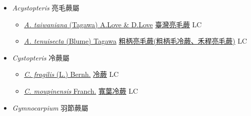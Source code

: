 
  \begin{itemize}
 \item[] \textit{Acystopteris} 亮毛蕨屬
                    
  \begin{itemize}
        \item[] \href{http://www.theplantlist.org/tpl1.1/search?q=Acystopteris+taiwaniana}{\textit{A. taiwaniana} (Tagawa) A.Love \& D.Love}   \href{\detokenize{http://taibnet.sinica.edu.tw/chi/taibnet_species_list.php?T2=臺灣亮毛蕨&T2_new_value=true&fr=y}}{臺灣亮毛蕨} LC
        \item[] \href{http://www.theplantlist.org/tpl1.1/search?q=Acystopteris+tenuisecta}{\textit{A. tenuisecta} (Blume) Tagawa}     \href{\detokenize{http://taibnet.sinica.edu.tw/chi/taibnet_species_list.php?T2=粗柄亮毛蕨&T2_new_value=true&fr=y}}{粗柄亮毛蕨(粗柄毛冷蕨、禾稈亮毛蕨)}    LC
  \end{itemize}
 \item[] \textit{Cystopteris} 冷蕨屬
                    
  \begin{itemize}
        \item[] \href{http://www.theplantlist.org/tpl1.1/search?q=Cystopteris+fragilis}{\textit{C. fragilis} (L.) Bernh.}   \href{\detokenize{http://taibnet.sinica.edu.tw/chi/taibnet_species_list.php?T2=冷蕨&T2_new_value=true&fr=y}}{冷蕨} LC
        \item[] \href{http://www.theplantlist.org/tpl1.1/search?q=Cystopteris+moupinensis}{\textit{C. moupinensis} Franch.}   \href{\detokenize{http://taibnet.sinica.edu.tw/chi/taibnet_species_list.php?T2=寬葉冷蕨&T2_new_value=true&fr=y}}{寬葉冷蕨} LC
  \end{itemize}
 \item[] \textit{Gymnocarpium} 羽節蕨屬
                    

\end{itemize}
